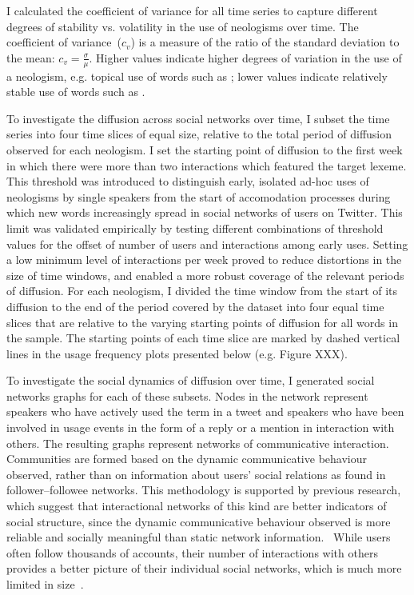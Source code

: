 \documentclass[
  a4paper,
  abstract=on,
  captions=tableabove
  ]{scrartcl}
\begin{document}
  I calculated the coefficient of variance for all time series to capture different degrees of stability vs. volatility in the use of neologisms over time. The coefficient of variance~($c_{v}$) is a measure of the ratio of the standard deviation to the mean: $c_{v} = \frac{\sigma}{\mu}$. Higher values indicate higher degrees of variation in the use of a neologism, e.g. topical use of words such as ; lower values indicate relatively stable use of words such as .

  To investigate the diffusion across social networks over time, I subset the time series into four time slices of equal size, relative to the total period of diffusion observed for each neologism. I set the starting point of diffusion to the first week in which there were more than two interactions which featured the target lexeme. This threshold was introduced to distinguish early, isolated ad-hoc uses of neologisms by single speakers from the start of accomodation processes during which new words increasingly spread in social networks of users on Twitter. This limit was validated empirically by testing different combinations of threshold values for the offset of number of users and interactions among early uses. Setting a low minimum level of interactions per week proved to reduce distortions in the size of time windows, and enabled a more robust coverage of the relevant periods of diffusion. For each neologism, I divided the time window from the start of its diffusion to the end of the period covered by the dataset into four equal time slices that are relative to the varying starting points of diffusion for all words in the sample. The starting points of each time slice are marked by dashed vertical lines in the usage frequency plots presented below (e.g. Figure XXX).

  To investigate the social dynamics of diffusion over time, I generated social networks graphs for each of these subsets. Nodes in the network represent speakers who have actively used the term in a tweet and speakers who have been involved in usage events in the form of a reply or a mention in interaction with others. The resulting graphs represent networks of communicative interaction. Communities are formed based on the dynamic communicative behaviour observed, rather than on information about users' social relations as found in follower--followee networks. This methodology is supported by previous research, which suggest that interactional networks of this kind are better indicators of social structure, since the dynamic communicative behaviour observed is more reliable and socially meaningful than static network information.~\parencite{Goel2016SocialDynamics, Huberman2008SocialNetworks} While users often follow thousands of accounts, their number of interactions with others provides a better picture of their individual social networks, which is much more limited in size~\parencite{Dunbar1992NeocortexSize}.
\end{document}
